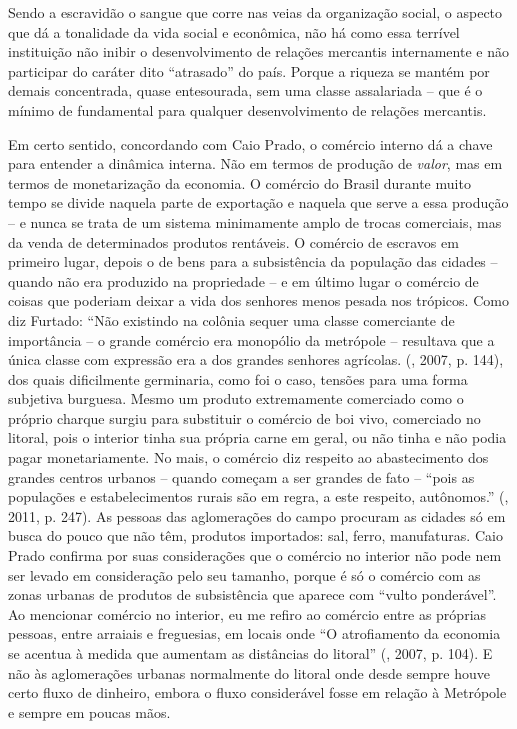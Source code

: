 {Sendo a escravidão o sangue que corre nas veias da organização social, o
aspecto que dá a tonalidade da vida social e econômica, não há como essa
terrível instituição não inibir o desenvolvimento de relações mercantis
internamente e não participar do caráter dito ``atrasado'' do país.
Porque a riqueza se mantém por demais concentrada, quase entesourada,
sem uma classe assalariada -- que é o mínimo de fundamental para
qualquer desenvolvimento de relações mercantis.

Em certo sentido, concordando com Caio Prado, o comércio interno dá a
chave para entender a dinâmica interna. Não em termos de produção de
\emph{valor}, mas em termos de monetarização da economia. O comércio do
Brasil durante muito tempo se divide naquela parte de exportação e
naquela que serve a essa produção -- e nunca se trata de um sistema
minimamente amplo de trocas comerciais, mas da venda de determinados
produtos rentáveis. O comércio de escravos em primeiro lugar, depois o
de bens para a subsistência da população das cidades -- quando não era
produzido na propriedade -- e em último lugar o comércio de coisas que
poderiam deixar a vida dos senhores menos pesada nos trópicos. Como diz
Furtado: ``Não existindo na colônia sequer uma classe comerciante de
importância -- o grande comércio era monopólio da metrópole -- resultava
que a única classe com expressão era a dos grandes senhores agrícolas.
(, 2007, p. 144), dos quais dificilmente germinaria, como foi o
caso, tensões para uma forma subjetiva burguesa. Mesmo um produto
extremamente comerciado como o próprio charque surgiu para substituir o
comércio de boi vivo, comerciado no litoral, pois o interior tinha sua
própria carne em geral, ou não tinha e não podia pagar monetariamente.
No mais, o comércio diz respeito ao abastecimento dos grandes centros
urbanos -- quando começam a ser grandes de fato -- ``pois as populações
e estabelecimentos rurais são em regra, a este respeito, autônomos.''
(, 2011, p. 247). As pessoas das aglomerações do campo procuram as
cidades só em busca do pouco que não têm, produtos importados: sal,
ferro, manufaturas. Caio Prado confirma por suas considerações que o
comércio no interior não pode nem ser levado em consideração pelo seu
tamanho, porque é só o comércio com as zonas urbanas de produtos de
subsistência que aparece com ``vulto ponderável''. Ao mencionar comércio
no interior, eu me refiro ao comércio entre as próprias pessoas, entre
arraiais e freguesias, em locais onde ``O atrofiamento da economia se
acentua à medida que aumentam as distâncias do litoral'' (, 2007,
p. 104). E não às aglomerações urbanas normalmente do litoral onde desde
sempre houve certo fluxo de dinheiro, embora o fluxo considerável fosse
em relação à Metrópole e sempre em poucas mãos.

}
